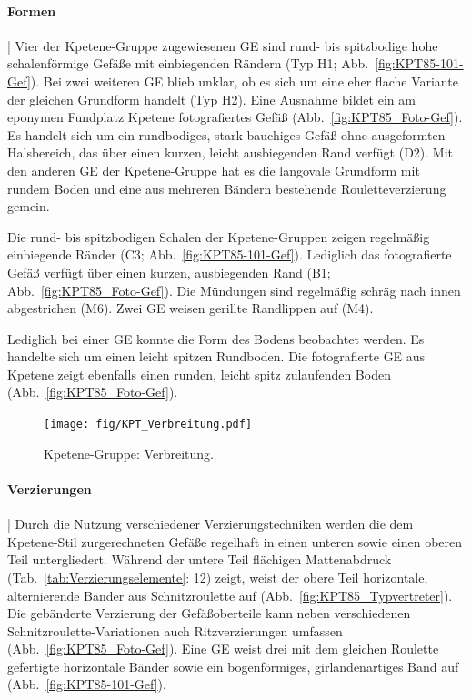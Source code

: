\paragraph{Formen}\hspace{-.5em}|\hspace{.5em}%
Vier der Kpetene-Gruppe zugewiesenen GE sind rund- bis spitzbodige hohe schalenförmige Gefäße mit einbiegenden Rändern (Typ H1; Abb.~\ref{fig:KPT85-101-Gef}). Bei zwei weiteren GE blieb unklar, ob es sich um eine eher flache Variante der gleichen Grundform handelt (Typ H2). Eine Ausnahme bildet ein am eponymen Fundplatz Kpetene fotografiertes Gefäß (Abb.~\ref{fig:KPT85_Foto-Gef}). Es handelt sich um ein rundbodiges, stark bauchiges Gefäß ohne ausgeformten Halsbereich, das über einen kurzen, leicht ausbiegenden Rand verfügt (D2). Mit den anderen GE der Kpetene-Gruppe hat es die langovale Grundform mit rundem Boden und eine aus mehreren Bändern bestehende Rouletteverzierung gemein.

Die rund- bis spitzbodigen Schalen der Kpetene-Gruppen zeigen regelmäßig einbiegende Ränder (C3; Abb.~\ref{fig:KPT85-101-Gef}). Lediglich das fotografierte Gefäß verfügt über einen kurzen, ausbiegenden Rand (B1; Abb.~\ref{fig:KPT85_Foto-Gef}). Die Mündungen sind regelmäßig schräg nach innen abgestrichen (M6). Zwei GE weisen gerillte Randlippen auf (M4).

Lediglich bei einer GE konnte die Form des Bodens beobachtet werden. Es handelte sich um einen leicht spitzen Rundboden. Die fotografierte GE aus Kpetene zeigt ebenfalls einen runden, leicht spitz zulaufenden Boden (Abb.~\ref{fig:KPT85_Foto-Gef}).

\begin{figure}[p]
	\centering
	\texttt{[image: fig/KPT\_Verbreitung.pdf]}
	\caption{Kpetene-Gruppe: Verbreitung.}
	\label{fig:KPT_Verbreitung}
\end{figure}

\paragraph{Verzierungen}\hspace{-.5em}|\hspace{.5em}%
Durch die Nutzung verschiedener Verzierungstechniken werden die dem Kpetene-Stil zurgerechneten Gefäße regelhaft in einen unteren sowie einen oberen Teil untergliedert. Während der untere Teil flächigen Mattenabdruck (Tab.~\ref{tab:Verzierungselemente}: 12) zeigt, weist der obere Teil horizontale, alternierende Bänder aus Schnitzroulette auf (Abb.~\ref{fig:KPT85_Typvertreter}). Die gebänderte Verzierung der Gefäßoberteile kann neben verschiedenen Schnitzroulette-Variationen auch Ritzverzierungen umfassen (Abb.~\ref{fig:KPT85_Foto-Gef}). Eine GE weist drei mit dem gleichen \mbox{Roulette} gefertigte horizontale  Bänder sowie ein bogenförmiges, girlandenartiges Band auf (Abb.~\ref{fig:KPT85-101-Gef}).

